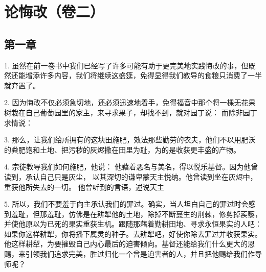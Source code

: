 
\section{论悔改（卷二）}


\subsection{第一章}

\par

1. 虽然在前一卷书中我们已经写了许多可能有助于更完美地实践悔改的事，但既然还能增添许多内容，我们将继续这盛筵，免得显得我们教导的食粮只消费了一半就弃置了。\par

2. 因为悔改不仅必须急切地，还必须迅速地着手，免得福音中那个将一棵无花果树栽在自己葡萄园里的家主，来寻求果子，却找不到，就对园丁说： 而除非园丁求情说：\par

3. 那么，让我们给所拥有的这块田施肥，效法那些勤劳的农夫，他们不以用肥沃的粪肥饱和土地、把污秽的灰烬撒在田里为耻，为的是收获更丰盛的产物。\par

4. 宗徒教导我们如何施肥，他说： 他藉着恶名与美名，得以悦乐基督。因为他曾读到，承认自己只是灰尘， 以其深切的谦卑蒙天主悦纳。他曾读到坐在灰烬中， 重获他所失去的一切。 他曾听到的言语，述说天主\par

5. 所以，我们不要羞于向主承认我们的罪过。确实，当人坦白自己的罪过时会感到羞耻，但那羞耻，仿佛是在耕犁他的土地，除掉不断蔓生的荆棘，修剪掉蒺藜，并使他原以为已死的果实重获生机。跟随那藉着勤耕田地、寻求永恒果实的人吧： 如果你这样耕犁，你将播下属灵的种子。去耕犁吧，好使你除去罪过并收获果实。他这样耕犁，为要摧毁自己内心最后的迫害倾向。基督还能给我们什么更大的恩赐，来引领我们追求完美，胜过归化一个曾是迫害者的人，并且把他赐给我们作导师呢？\par


